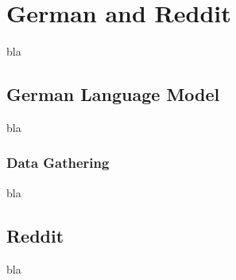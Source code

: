 \chapter{German and Reddit}

bla

\section{German Language Model}

bla

\subsection{Data Gathering}

bla

\section{Reddit}

bla
